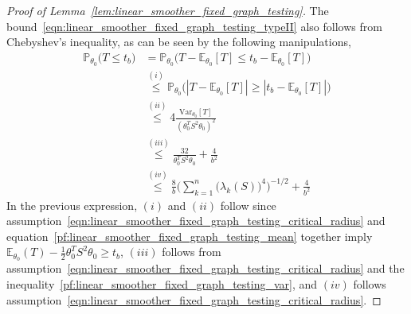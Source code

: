 \documentclass{article}
\newcommand{\abs}[1]{\left \lvert #1 \right \rvert}
\newcommand{\Var}{\mathrm{Var}}
\newcommand{\1}{\mathbf{1}}
\newcommand{\Pbb}{\mathbb{P}}
\newcommand{\Ebb}{\mathbb{E}}
\theoremstyle{alden}
\theoremstyle{aldenthm}
\theoremstyle{definition}
\theoremstyle{remark}
\begin{document}
\begin{proof}[Proof of Lemma~\ref{lem:linear_smoother_fixed_graph_testing}]
	The bound~\eqref{eqn:linear_smoother_fixed_graph_testing_typeII} also follows from Chebyshev's inequality, as can be seen by the following manipulations,
	\begin{equation*}
	\begin{aligned}
	\Pbb_{\theta_0}\bigl(T \leq t_b\bigr) & = \Pbb_{\theta_0}\bigl(T - \Ebb_{\theta_0}[T] \leq t_b - \Ebb_{\theta_0}[T]\bigr) \\
	& \overset{(i)}{\leq} \Pbb_{\theta_0}\bigl(\abs{T - \Ebb_{\theta_0}[T]} \geq \abs{t_b - \Ebb_{\theta_0}[T]}\bigr) \\ 
	& \overset{(ii)}{\leq} 4 \frac{\Var_{\theta_0}[T]}{(\theta_0^T S^2 \theta_0)^2} \\
	& \overset{(iii)}{\leq} \frac{32}{\theta_0^T S^2 \theta_0} + \frac{4}{b^2} \\
	& \overset{(iv)}{\leq} \frac{8}{b} \Biggl(\sum_{k = 1}^{n}\bigl(\lambda_k(S)\bigr)^4\Biggr)^{-1/2} + \frac{4}{b^2}
	\end{aligned}
	\end{equation*}
	In the previous expression, $(i)$ and $(ii)$ follow since assumption~\eqref{eqn:linear_smoother_fixed_graph_testing_critical_radius} and equation~\eqref{pf:linear_smoother_fixed_graph_testing_mean} together imply $\Ebb_{\theta_0}(T) - \frac{1}{2}\theta_0^T S^2\theta_0 \geq t_b$, $(iii)$ follows from assumption~\eqref{eqn:linear_smoother_fixed_graph_testing_critical_radius} and the inequality~\eqref{pf:linear_smoother_fixed_graph_testing_var}, and $(iv)$ follows assumption~\eqref{eqn:linear_smoother_fixed_graph_testing_critical_radius}.
\end{proof}
\end{document}
